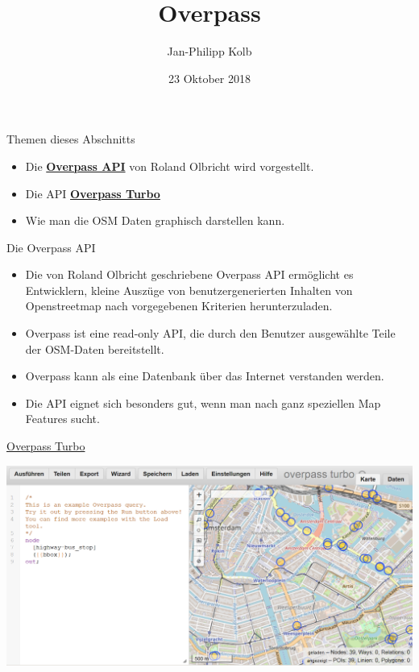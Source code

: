 \documentclass[ignorenonframetext,]{beamer}
\title{Overpass}
\author{Jan-Philipp Kolb}
\date{23 Oktober 2018}
\providecommand{\tightlist}{%
  \setlength{\itemsep}{0pt}\setlength{\parskip}{0pt}}
\begin{document}
\frame{\titlepage}

\begin{frame}{Themen dieses Abschnitts}
\protect\hypertarget{themen-dieses-abschnitts}{}

\begin{itemize}
\tightlist
\item
  Die
  \href{https://wiki.openstreetmap.org/wiki/Overpass_API}{\textbf{Overpass
  API}} von Roland Olbricht wird vorgestellt.
\item
  Die API \href{https://overpass-turbo.eu/}{\textbf{Overpass Turbo}}
\item
  Wie man die OSM Daten graphisch darstellen kann.
\end{itemize}

\end{frame}

\begin{frame}{Die Overpass API}
\protect\hypertarget{die-overpass-api}{}

\begin{itemize}
\tightlist
\item
  Die von Roland Olbricht geschriebene Overpass API ermöglicht es
  Entwicklern, kleine Auszüge von benutzergenerierten Inhalten von
  Openstreetmap nach vorgegebenen Kriterien herunterzuladen.
\item
  Overpass ist eine read-only API, die durch den Benutzer ausgewählte
  Teile der OSM-Daten bereitstellt.
\item
  Overpass kann als eine Datenbank über das Internet verstanden werden.
\item
  Die API eignet sich besonders gut, wenn man nach ganz speziellen Map
  Features sucht.
\end{itemize}

\end{frame}

\begin{frame}{\href{https://overpass-turbo.eu/}{Overpass Turbo}}
\protect\hypertarget{overpass-turbo}{}

\includegraphics{figure/overpassTurbo.PNG}

\end{frame}
\end{document}
